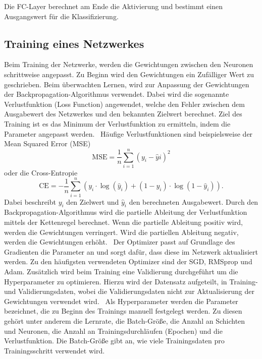 Die FC-Layer berechnet am Ende die Aktivierung und bestimmt einen Ausgangswert für die Klassifizierung.
\subsection{Training eines Netzwerkes}

Beim Training der Netzwerke, werden die Gewichtungen zwischen den Neuronen schrittweise angepasst. 
Zu Beginn wird den Gewichtungen ein Zufälliger Wert zu geschrieben.
Beim überwachten Lernen, wird zur Anpassung der Gewichtungen der Backpropagation-Algorithmus verwendet.
Dabei wird die sogenannte Verlustfunktion (Loss Function) angewendet, welche den Fehler zwischen dem Ausgabewert des Netzwerkes und den bekannten Zielwert berechnet.
Ziel des Training ist es das Minimum der Verlustfunktion zu ermitteln, indem die Parameter angepasst werden.~\cite{datascience}
Häufige Verlustfunktionen sind beispielsweise der Mean Squared Error (MSE)
\begin{equation}
  \text{MSE}  =  \frac{1}{n} \sum_{i=1}^{n} (y_i - \hat{y}i)^2
\end{equation}
oder die Cross-Entropie  
\begin{equation}
\text{CE} = -\frac{1}{n} \sum_{i=1}^{n} \left( y_i \cdot \log(\hat{y}_i) + (1 - y_i) \cdot \log(1 - \hat{y}_i) \right).
\end{equation}
Dabei beschreibt $y_i$ den Zielwert und $\hat{y}_i$ den berechneten Ausgabewert.
Durch den Backpropagation-Algorithmus wird die partielle Ableitung der Verlustfunktion mittels der Kettenregel berechnet.
Wenn die partielle Ableitung positiv wird, werden die Gewichtungen verringert. 
Wird die partiellen Ableitung negativ, werden die Gewichtungen erhöht.~\cite{neuralnet}
Der Optimizer passt auf Grundlage des Gradienten die Parameter an und sorgt dafür, dass diese im Netzwerk aktualisiert werden.
Zu den häufigsten verwendeten Optimizer sind der SGD, RMSprop und Adam.
Zusätzlich wird beim Training eine Validierung durchgeführt um die Hyperparameter zu optimieren. 
Hierzu wird der Datensatz aufgeteilt, in Training- und Validierungsdaten, wobei die Validierungsdaten nicht zur Aktualisierung 
der Gewichtungen verwendet wird.~\cite{Yamashita2018}
Als Hyperparameter werden die Parameter bezeichnet, die zu Beginn des Trainings manuell festgelegt werden.
Zu diesen gehört unter anderem die Lernrate, die Batch-Größe, die Anzahl an Schichten und Neuronen, die Anzahl an Trainingsdurchläufen (Epochen)
und die Verlustfunktion.
Die Batch-Größe gibt an, wie viele Trainingsdaten pro Trainingsschritt verwendet wird.~\cite{datascience} 

